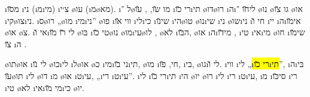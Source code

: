 %
{ \i{מ}\u{סו} \i{ני}  (\i{מ}\i{מי}) \i{צ׳י} \o{עו} (\i{מ}\o{מא}). \i{ל} ־\o{מו} \u{שו}, ,  \u{עו} \i{רי} \u{כו}\i{תי}   \o{דו}\o{רו} \i{ה}\i{לי}\u{חו} ־ \o{נו}  \o{גו} \u{צו} \o{או} \i{קי}\o{צו}\i{ני}.}
 \i{ס}\o{רו} „\o{מו} \i{מי}\i{ני}” \o{פו} \i{ווי} \u{או} \i{לי}\i{כי}    \i{שי}\u{נו}  \i{הי}\o{טו} \o{נו}\i{שי} \i{ני} \o{שו}\i{ני}  \i{חי} \u{ו} \i{יי} \i{ה}\i{אי}\u{מו} \o{או} \o{צ}. \i{אי} \u{ו}\i{לי} \u{רו} \u{מו} \o{בּו} \i{טי}  \u{כו}\o{נו} \o{מו}\i{עי}\o{לו} , \o{לא} \i{ה}\u{בּו}, \o{או} \i{ה}\i{מי}\u{דו} , \i{טי} \i{אי}\i{מי} \o{חו} \i{שי}\u{מו} \u{צו} \i{ה} .

 \o{תו}\o{או} \i{לי} \u{נו} \o{כו}\i{לי} \i{ל}\o{או} \o{כ} \i{מי}\i{ני} \u{בו}\i{תי}, \o{מו} \i{חי}, \u{פו}, \i{בי}, \o{גו}\i{לי} \u{ו}. \i{ווי}  \i{לי}  „\hl{\i{רי} \u{כו}\i{תי}}”, \i{ה}\i{בּי} \u{עו}\o{תו}  \i{לי} \o{דו} \i{מ} \o{או} \i{ט}\i{עי}, „\i{רי} \i{ט}\i{עי}”. \i{לי} \i{רי} \u{כו}\i{תי} \i{הי}  \o{יו} \o{רו} \i{לי} \i{רי} \i{ט}\i{עי}, \i{מ} \i{סי}\u{כּו} \i{רי}  \i{טי} \o{לא} \i{אי}\i{מי} \u{מו}\i{כי} \o{יו}.



